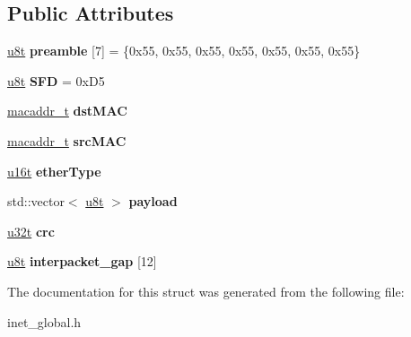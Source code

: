 \subsection*{Public Attributes}
\begin{DoxyCompactItemize}
\item 
\mbox{\label{structeth__frame__t_a7e917da155e1a71584d77ba116c51537}} 
\hyperlink{macros_8h_a176a4ab0531a048e0693a4520c550193}{u8t} {\bfseries preamble} \mbox{[}7\mbox{]} = \{0x55, 0x55, 0x55, 0x55, 0x55, 0x55, 0x55\}
\item 
\mbox{\label{structeth__frame__t_a2373b35ac05da6d436fa1369a9868417}} 
\hyperlink{macros_8h_a176a4ab0531a048e0693a4520c550193}{u8t} {\bfseries S\+FD} = 0x\+D5
\item 
\mbox{\label{structeth__frame__t_ac8ac769f22710edece8c5de6f206b793}} 
\hyperlink{structmacaddr__t}{macaddr\+\_\+t} {\bfseries dst\+M\+AC}
\item 
\mbox{\label{structeth__frame__t_a23bd734d1f17859fca7aa01cf036e21d}} 
\hyperlink{structmacaddr__t}{macaddr\+\_\+t} {\bfseries src\+M\+AC}
\item 
\mbox{\label{structeth__frame__t_a955b35cc93d08eab023f0fa1383a6107}} 
\hyperlink{macros_8h_a590a9a8f7df8fabfac6573e21da1922d}{u16t} {\bfseries ether\+Type}
\item 
\mbox{\label{structeth__frame__t_aa4b072edd94e393936b674c077dcf001}} 
std\+::vector$<$ \hyperlink{macros_8h_a176a4ab0531a048e0693a4520c550193}{u8t} $>$ {\bfseries payload}
\item 
\mbox{\label{structeth__frame__t_ab479ce46f2f16015beb4f05eccae7b52}} 
\hyperlink{macros_8h_a464a07ed2c6d005d677113cc44750a64}{u32t} {\bfseries crc}
\item 
\mbox{\label{structeth__frame__t_aa64d327330c12dd5675c9b3ea5b717db}} 
\hyperlink{macros_8h_a176a4ab0531a048e0693a4520c550193}{u8t} {\bfseries interpacket\+\_\+gap} \mbox{[}12\mbox{]}
\end{DoxyCompactItemize}


The documentation for this struct was generated from the following file\+:\begin{DoxyCompactItemize}
\item 
inet\+\_\+global.\+h\end{DoxyCompactItemize}
